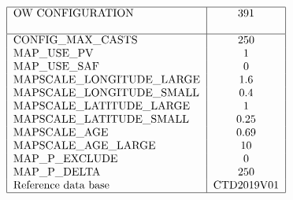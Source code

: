 \documentclass[11pt,titlepage]{article}
\begin{document}
\pagestyle{plain}
\begin{table}[h]
$$
\begin{tabular}{|l|c|}
\hline
OW CONFIGURATION 		& 391     	\\
				&                \\
\hline
CONFIG\_MAX\_CASTS		& 250     	\\
MAP\_USE\_PV			& 1       	\\
MAP\_USE\_SAF		        & 0        	\\
MAPSCALE\_LONGITUDE\_LARGE	& 1.6     	\\
MAPSCALE\_LONGITUDE\_SMALL	& 0.4        \\
MAPSCALE\_LATITUDE\_LARGE 	& 1           \\
MAPSCALE\_LATITUDE\_SMALL 	& 0.25      \\
MAPSCALE\_AGE		 	& 0.69    \\
MAPSCALE\_AGE\_LARGE		& 10    	\\
MAP\_P\_EXCLUDE		 	& 0      \\
MAP\_P\_DELTA		 	& 250      \\
Reference data base      	&  CTD2019V01   \\ 
\hline
\end{tabular}
$$
\label{tab3}
\end{table}
\end{document}
